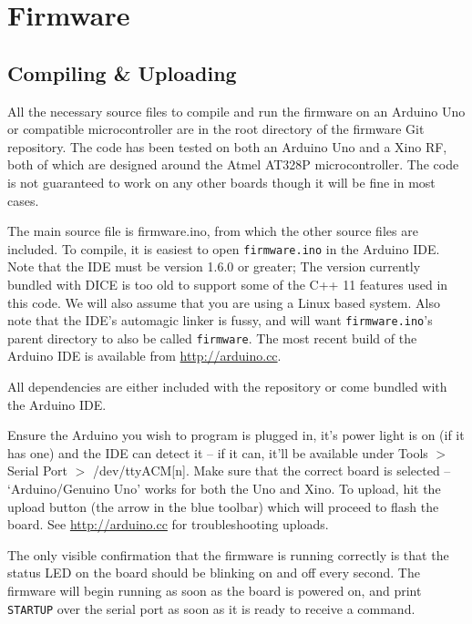%
%

\section{Firmware}

\subsection{Compiling \& Uploading}

All the necessary source files to compile and run the firmware on an Arduino Uno or compatible microcontroller are in the root directory of the firmware Git repository. The code has been tested on both an Arduino Uno and a Xino RF, both of which are designed around the Atmel AT328P microcontroller. The code is not guaranteed to work on any other boards though it will be fine in most cases.

The main source file is firmware.ino, from which the other source files are included. To compile, it is easiest to open \texttt{firmware.ino} in the Arduino IDE. Note that the IDE must be version 1.6.0 or greater; The version currently bundled with DICE is too old to support some of the C++ 11 features used in this code. We will also assume that you are using a Linux based system. Also note that the IDE's automagic linker is fussy, and will want \texttt{firmware.ino}'s parent directory to also be called \texttt{firmware}. The most recent build of the Arduino IDE is available from \href{http://arduino.cc}{http://arduino.cc}.

All dependencies are either included with the repository or come bundled with the Arduino IDE.

Ensure the Arduino you wish to program is plugged in, it's power light is on (if it has one) and the IDE can detect it -- if it can, it'll be available under Tools $>$ Serial Port $>$ /dev/ttyACM[n]. Make sure that the correct board is selected -- `Arduino/Genuino Uno' works for both the Uno and Xino. To upload, hit the upload button (the arrow in the blue toolbar) which will proceed to flash the board. See \href{http://arduino.cc}{http://arduino.cc} for troubleshooting uploads.

The only visible confirmation that the firmware is running correctly is that the status LED on the board should be blinking on and off every second. The firmware will begin running as soon as the board is powered on, and print \verb|STARTUP| over the serial port as soon as it is ready to receive a command.

